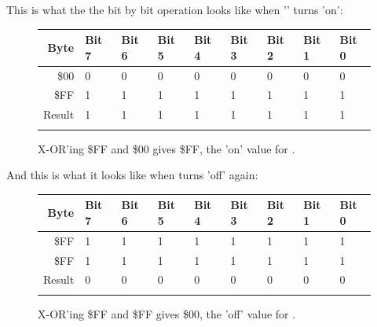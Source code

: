 This is what the the bit by bit operation looks like when '' turns
 'on':

\begin{figure}[H]
  {
    \setlength{\tabcolsep}{3.0pt}
    \setlength\cmidrulewidth{\heavyrulewidth} %
    \begin{adjustbox}{width=7cm,center}

      \begin{tabular}{rllllllll}
        \toprule
        Byte & Bit 7 & Bit 6 & Bit 5 & Bit 4 & Bit 3 & Bit 2 & Bit 1 & Bit 0        \\
        \midrule
        \$00 & 0 & 0 & 0 & 0 & 0 & 0 & 0 & 0 \\
        \$FF & 1 & 1 & 1 & 1 & 1 & 1 & 1 & 1 \\
        \midrule
        Result & 1 & 1 & 1 & 1 & 1 & 1 & 1 & 1 \\
        \addlinespace
        \bottomrule
      \end{tabular}

    \end{adjustbox}

  }\caption*{X-OR'ing \$FF and \$00 gives \$FF, the 'on' value for .}
\end{figure}

And this is what it looks like when  turns  'off' again:
\begin{figure}[H]
  {
    \setlength{\tabcolsep}{3.0pt}
    \setlength\cmidrulewidth{\heavyrulewidth} %
    \begin{adjustbox}{width=7cm,center}

      \begin{tabular}{rllllllll}
        \toprule
        Byte & Bit 7 & Bit 6 & Bit 5 & Bit 4 & Bit 3 & Bit 2 & Bit 1 & Bit 0        \\
        \midrule
        \$FF & 1 & 1 & 1 & 1 & 1 & 1 & 1 & 1 \\
        \$FF & 1 & 1 & 1 & 1 & 1 & 1 & 1 & 1 \\
        \midrule
        Result & 0 & 0 & 0 & 0 & 0 & 0 & 0 & 0 \\
        \addlinespace
        \bottomrule
      \end{tabular}

    \end{adjustbox}

  }\caption*{X-OR'ing \$FF and \$FF gives \$00, the 'off' value for .}
\end{figure}
\clearpage

